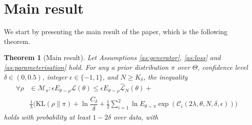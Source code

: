 \documentclass{article}
\newcommand{\KL}{\mathrm{KL}}
\renewcommand{\KL}{\mathrm{KL}}
\newtheorem{theorem}{Theorem}[section]
\begin{document}
\section{Main result}
\label{sec:main_results}
 We start by presenting the main result of the paper, which is the following theorem.
\begin{theorem}[Main result]
\label{thm:main}
    Let Assumptions \ref{as:generator}, \ref{as:loss} and \ref{as:parameterisation} hold.
    For any a prior distribution $\pi$ over $\Theta$, confidence level  $\delta\in(0,0.5)$, integer $\epsilon \in \{-1,1\}$,  and $N \ge K_{\delta}$, 
    the inequality
    \begin{equation}
        \label{eq:initial:tildern1} 
    \begin{aligned}
         \forall \rho & \in \mathcal{M}_\pi: \epsilon E_{\theta\sim\rho} \mathcal{L}(\theta)
         \leq   \epsilon E_{\theta\sim\rho}\hat{\mathcal{L}}_N(\theta) +   \\
          & \frac{1}{\lambda}\Big(\KL(\rho\|\pi)  +\ln\dfrac{C_{\delta}}{\delta} + \frac{1}{2}\sum_{i=1}^2
            \ln E_{\theta\sim\pi} \exp\left(\mathcal{C}_i(2\lambda,\theta,N,\delta,\epsilon)\right) \Big)
    \end{aligned}
    \end{equation}
    holds with probability at least $1-2\delta$ over data, with

\end{theorem}
\end{document}

